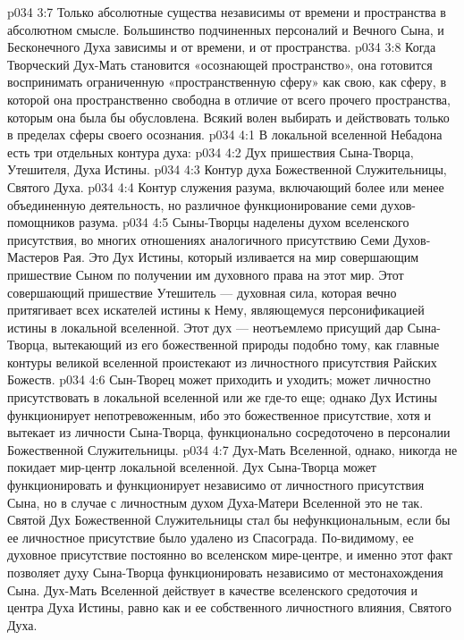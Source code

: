 \vs p034 3:7 \pc Только абсолютные существа независимы от времени и пространства в абсолютном смысле. Большинство подчиненных персоналий и Вечного Сына, и Бесконечного Духа зависимы и от времени, и от пространства.
\vs p034 3:8 Когда Творческий Дух\hyp{}Мать становится «осознающей пространство», она готовится воспринимать ограниченную «пространственную сферу» как свою, как сферу, в которой она пространственно свободна в отличие от всего прочего пространства, которым она была бы обусловлена. Всякий волен выбирать и действовать только в пределах сферы своего осознания.
\vs p034 4:1 В локальной вселенной Небадона есть три отдельных контура духа:
\vs p034 4:2 \bibnobreakspace Дух пришествия Сына\hyp{}Творца, Утешителя, Духа Истины.
\vs p034 4:3 \bibnobreakspace Контур духа Божественной Служительницы, Святого Духа.
\vs p034 4:4 \bibnobreakspace Контур служения разума, включающий более или менее объединенную деятельность, но различное функционирование семи духов\hyp{}помощников разума.
\vs p034 4:5 \pc Сыны\hyp{}Творцы наделены духом вселенского присутствия, во многих отношениях аналогичного присутствию Семи Духов\hyp{}Мастеров Рая. Это Дух Истины, который изливается на мир совершающим пришествие Сыном по получении им духовного права на этот мир. Этот совершающий пришествие Утешитель --- духовная сила, которая вечно притягивает всех искателей истины к Нему, являющемуся персонификацией истины в локальной вселенной. Этот дух --- неотъемлемо присущий дар Сына\hyp{}Творца, вытекающий из его божественной природы подобно тому, как главные контуры великой вселенной проистекают из личностного присутствия Райских Божеств.
\vs p034 4:6 Сын\hyp{}Творец может приходить и уходить; может личностно присутствовать в локальной вселенной или же где\hyp{}то еще; однако Дух Истины функционирует непотревоженным, ибо это божественное присутствие, хотя и вытекает из личности Сына\hyp{}Творца, функционально сосредоточено в персоналии Божественной Служительницы.
\vs p034 4:7 Дух\hyp{}Мать Вселенной, однако, никогда не покидает мир\hyp{}центр локальной вселенной. Дух Сына\hyp{}Творца может функционировать и функционирует независимо от личностного присутствия Сына, но в случае с личностным духом Духа\hyp{}Матери Вселенной это не так. Святой Дух Божественной Служительницы стал бы нефункциональным, если бы ее личностное присутствие было удалено из Спасограда. По\hyp{}видимому, ее духовное присутствие постоянно во вселенском мире\hyp{}центре, и именно этот факт позволяет духу Сына\hyp{}Творца функционировать независимо от местонахождения Сына. Дух\hyp{}Мать Вселенной действует в качестве вселенского средоточия и центра Духа Истины, равно как и ее собственного личностного влияния, Святого Духа.
